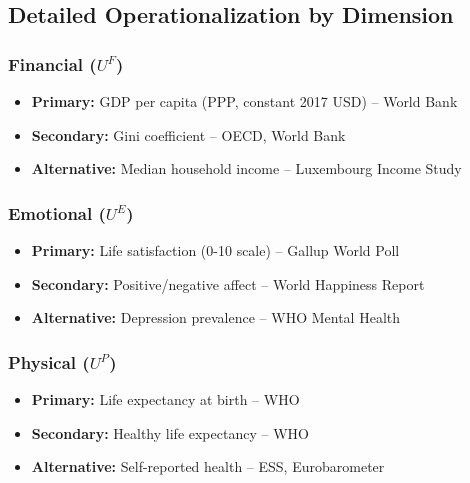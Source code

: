 
\subsection{Detailed Operationalization by Dimension}

\subsubsection{Financial ($U^F$)}

\begin{itemize}[nosep]
    \item \textbf{Primary:} GDP per capita (PPP, constant 2017 USD) -- World Bank
    \item \textbf{Secondary:} Gini coefficient -- OECD, World Bank
    \item \textbf{Alternative:} Median household income -- Luxembourg Income Study
\end{itemize}

\subsubsection{Emotional ($U^E$)}

\begin{itemize}[nosep]
    \item \textbf{Primary:} Life satisfaction (0-10 scale) -- Gallup World Poll
    \item \textbf{Secondary:} Positive/negative affect -- World Happiness Report
    \item \textbf{Alternative:} Depression prevalence -- WHO Mental Health
\end{itemize}

\subsubsection{Physical ($U^P$)}

\begin{itemize}[nosep]
    \item \textbf{Primary:} Life expectancy at birth -- WHO
    \item \textbf{Secondary:} Healthy life expectancy -- WHO
    \item \textbf{Alternative:} Self-reported health -- ESS, Eurobarometer
\end{itemize}

